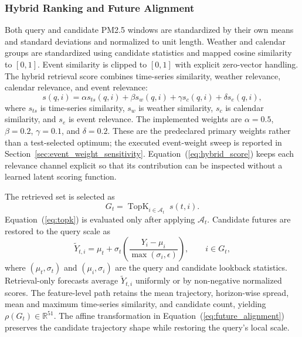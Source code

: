 \documentclass{ieeeaccess}
\begin{document}
\subsubsection{Hybrid Ranking and Future Alignment}
Both query and candidate PM2.5 windows are standardized by their own means and
standard deviations and normalized to unit length. Weather and calendar groups
are standardized using candidate statistics and mapped cosine similarity to
$[0,1]$. Event similarity is clipped to $[0,1]$ with explicit zero-vector
handling. The hybrid retrieval score combines time-series similarity, weather
relevance, calendar relevance, and event relevance:
\begin{equation}
    s(q, i) =
    \alpha s_{ts}(q,i) +
    \beta s_{w}(q,i) +
    \gamma s_{c}(q,i) +
    \delta s_{e}(q,i),
    \label{eq:hybrid_score}
\end{equation}
where $s_{ts}$ is time-series similarity, $s_w$ is weather similarity, $s_c$ is
calendar similarity, and $s_e$ is event relevance. The implemented weights are
$\alpha=0.5$, $\beta=0.2$, $\gamma=0.1$, and $\delta=0.2$. These are the
predeclared primary weights rather than a test-selected optimum; the executed
event-weight sweep is reported in Section~\ref{sec:event_weight_sensitivity}.
Equation~(\ref{eq:hybrid_score}) keeps each relevance channel explicit so that
its contribution can be inspected without a learned latent scoring function.

The retrieved set is selected as
\begin{equation}
    G_t = \operatorname{TopK}_{i \in \mathcal{A}_t}\; s(t,i).
    \label{eq:topk}
\end{equation}
Equation~(\ref{eq:topk}) is evaluated only after applying
$\mathcal{A}_t$. Candidate futures are restored to the query scale as
\begin{equation}
\widetilde{Y}_{t,i}=\mu_t+\sigma_t
\left(\frac{Y_i-\mu_i}{\max(\sigma_i,\epsilon)}\right),
\qquad i\in G_t,
\label{eq:future_alignment}
\end{equation}
where $(\mu_t,\sigma_t)$ and $(\mu_i,\sigma_i)$ are the query and candidate
lookback statistics. Retrieval-only forecasts average
$\widetilde{Y}_{t,i}$ uniformly or by non-negative normalized scores. The
feature-level path retains the mean trajectory, horizon-wise spread, mean and
maximum time-series similarity, and candidate count, yielding
$\rho(G_t)\in\mathbb{R}^{51}$.
The affine transformation in Equation~(\ref{eq:future_alignment}) preserves
the candidate trajectory shape while restoring the query's local scale.
\end{document}
